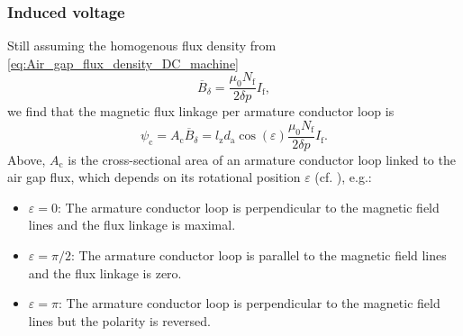 \begin{frame}
	\frametitle{Induced voltage}
		Still assuming the homogenous flux density from \eqref{eq:Air_gap_flux_density_DC_machine} $$\overline{B}_\delta = \frac{\mu_0 N_\mathrm{f}}{2 \delta p} I_\mathrm{f},$$ \pause we find that the magnetic flux linkage per armature conductor loop is
		\begin{equation}
			\psi_\mathrm{c} = A_\mathrm{c}\overline{B}_\delta= l_\mathrm{z} d_\mathrm{a}\cos(\varepsilon) \frac{\mu_0 N_\mathrm{f}}{2 \delta p} I_\mathrm{f}.
			\label{eq:Magnetic_flux_linkage_per_conductor}
		\end{equation} 
		Above, $A_\mathrm{c}$ is the cross-sectional area of an armature conductor loop linked  to the air gap flux, which depends on its rotational position $\varepsilon$ (cf. ), e.g.:
		\begin{itemize}
			\item $\varepsilon = 0$: The armature conductor loop is perpendicular to the magnetic field lines and the flux linkage is maximal.
			\item $\varepsilon = \pi/2$: The armature conductor loop is parallel to the magnetic field lines and the flux linkage is zero.
			\item $\varepsilon = \pi$: The armature conductor loop is perpendicular to the magnetic field lines but the polarity is reversed.
		\end{itemize}
\end{frame}

